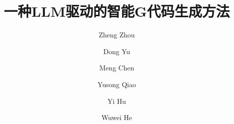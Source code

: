 \documentclass[preprint,12pt]{elsarticle}
\begin{document}
\begin{frontmatter}



\title{一种LLM驱动的智能G代码生成方法}



\author[ucas,sict]{Zheng Zhou}

\author[ucas,casnc]{Dong Yu}

\author[ucas,sict]{Meng Chen}

\author[ucas,sict]{Yusong Qiao}

\author[ucas,casnc]{Yi Hu}

\author[ucas,sict]{Wuwei He}


\address[ucas]{University of Chinese Academy of Sciences,
            Beijing 100049, 
            PR China}



\end{frontmatter}
\end{document}
